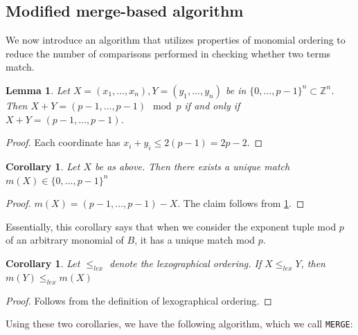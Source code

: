 \documentclass[a4paper]{article}
\newtheorem{lem}[thm]{Lemma}
\newtheorem{cor}[thm]{Corollary}
\theoremstyle{definition}
\theoremstyle{remark}
\newcommand{\ins}{\subset}
\newcommand{\merge}{\texttt{MERGE}}
\begin{document}
\subsection{Modified merge-based algorithm}

We now introduce an algorithm that utilizes 
properties of monomial ordering to reduce the 
number of comparisons 
performed in checking whether two terms match.

\begin{lem}
	\label{lem:tuples:modp}
	Let \(X = (x_{1}, \ldots, x_{n}),
	Y = (y_{1}, \ldots, y_{n})\)
	be in \(\{0, \ldots, p-1\}^{n} \ins \mathbb{Z}^{n}\).
	Then \(X + Y = 
	(p-1, \ldots, p-1) \mod p\)
	if and only if 
	\(X + Y = 
	(p-1, \ldots, p-1)\).
\end{lem}

\begin{proof}
	Each coordinate has \(x_{i} + y_{i} \leq 2(p-1) = 2p-2\).
\end{proof}

\begin{cor}
    \label{cor:unique:match}
	Let $X$ be as above.
	Then there exists a unique
	match \(m(X) \in \{0, \ldots, p-1\}^{n}\) 
\end{cor}

\begin{proof}
	\(m(X) = 
	(p-1, \ldots, p-1) - X\).
	The claim follows from 
	\ref{lem:tuples:modp}.
\end{proof}

Essentially, this corollary says that
when we consider the exponent tuple mod $p$ of 
an arbitrary monomial of \(B\),
it has a unique
match mod \(p\).

\begin{cor}
	\label{cor:match:order}
	Let \(\leq_{lex}\) denote the 
	lexographical ordering.
	If \(X \leq_{lex} Y\),
	then 
	\(m(Y) \leq_{lex} m(X)\)
\end{cor}

\begin{proof}
	Follows from the definition of lexographical
	ordering.
\end{proof}

Using these two corollaries, we have the following algorithm,
which we call \merge:
\end{document}
